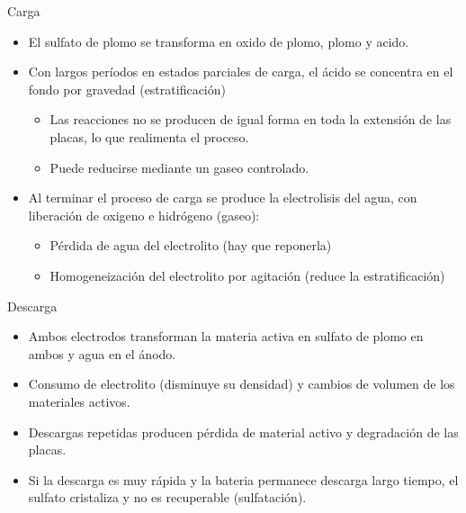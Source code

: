 \documentclass[xcolor={usenames,svgnames,dvipsnames}]{beamer}
\begin{document}
\begin{frame}[label=sec-2-2-6]{Carga}
\begin{itemize}
\item El sulfato de plomo se transforma en oxido de plomo, plomo y acido.

\item Con largos períodos en estados parciales de carga, el ácido se concentra en el fondo por gravedad (\alert{estratificación})

\begin{itemize}
\item Las reacciones no se producen de igual forma en toda la extensión de las placas, lo que realimenta el proceso.

\item Puede reducirse mediante un gaseo controlado.
\end{itemize}

\item Al terminar el proceso de carga se produce la electrolisis del agua, con liberación de oxigeno e hidrógeno (\alert{gaseo}):

\begin{itemize}
\item Pérdida de agua del electrolito (hay que reponerla)

\item Homogeneización del electrolito por agitación (reduce la estratificación)
\end{itemize}
\end{itemize}
\end{frame}


\begin{frame}[label=sec-2-2-7]{Descarga}
\begin{itemize}
\item Ambos electrodos transforman la materia activa en sulfato de plomo en ambos y agua en el ánodo.

\item \alert{Consumo de electrolito} (disminuye su densidad) y \alert{cambios de volumen} de los materiales activos.

\item \alert{Descargas repetidas} producen \alert{pérdida de material activo} y degradación de las placas.

\item Si la descarga es muy rápida y la bateria permanece descarga largo tiempo, el sulfato cristaliza y no es recuperable (\alert{sulfatación}).
\end{itemize}
\end{frame}
\end{document}
